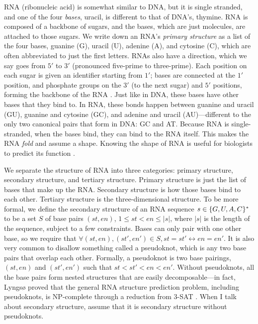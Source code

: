 \documentclass{cshonours}
\DeclarePairedDelimiter{\br}{\{}{\}}
\newcommand{\lyngso}{Lyngs{\o} }
\newcommand{\IFF}{\leftrightarrow}
\begin{document}
RNA (ribonucleic acid) is somewhat similar to DNA, but it is single stranded, and one of the four \emph{bases}, uracil, is different to that of DNA's, thymine. RNA is composed of a backbone of sugars, and the bases, which are just molecules, are attached to those sugars. We write down an RNA's \emph{primary structure} as a list of the four bases, guanine (G), uracil (U), adenine (A), and cytosine (C), which are often abbreviated to just the first letters. RNAs also have a direction, which we say goes from $5'$ to $3'$ (pronounced five-prime to three-prime). Each position on each sugar is given an identifier starting from $1'$; bases are connected at the $1'$ position, and phosphate groups on the $3'$ (to the next sugar) and $5'$ positions, forming the backbone of the RNA \cite{basicInfo}. Just like in DNA, these bases have other bases that they bind to. In RNA, these bonds happen between guanine and uracil (GU), guanine and cytosine (GC), and adenine and uracil (AU)---different to the only two canonical pairs that form in DNA: GC and AT. Because RNA is single-stranded, when the bases bind, they can bind to the RNA itself. This makes the RNA \emph{fold} and assume a shape.  Knowing the shape of RNA is useful for biologists to predict its function \cite{connRnaBackground}.

We separate the structure of RNA into three categories: primary structure, secondary structure, and tertiary structure. Primary structure is just the list of bases that make up the RNA. Secondary structure is how those bases bind to each other. Tertiary structure is the three-dimensional structure. To be more formal, we define the secondary structure of an RNA sequence $s \in \br{G, U, A, C}^*$ to be a set $S$ of base pairs $(st, en)$, $1 \leq st < en \leq |s|$, where $|s|$ is the length of the sequence, subject to a few constraints. Bases can only pair with one other base, so we require that $\forall (st, en), (st', en') \in S, st = st' \IFF en = en'$. It is also very common to disallow something called a pseudoknot, which is any two base pairs that overlap each other. Formally, a pseudoknot is two base pairings, $(st, en)$ and $(st', en')$ such that $st < st' < en < en'$. Without pseudoknots, all the base pairs form nested structures that are easily decomposable---in fact, \lyngso proved that the general RNA structure prediction problem, including pseudoknots, is NP-complete through a reduction from 3-SAT \cite{lyngsoPseudoknot}. When I talk about secondary structure, assume that it is secondary structure without pseudoknots.
\end{document}
